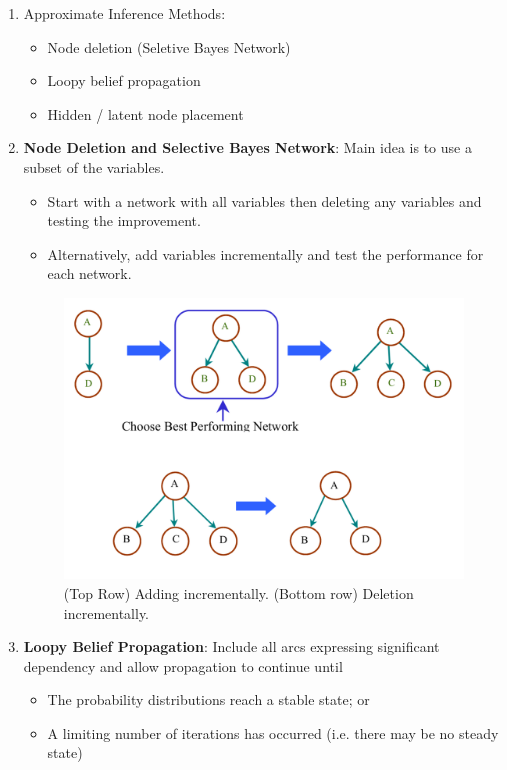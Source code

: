 \documentclass[12pt,twoside]{article}
\begin{document}
\begin{enumerate}
	\item Approximate Inference Methods:
		\begin{itemize}
			\item Node deletion (Seletive Bayes Network)
			\item Loopy belief propagation
			\item Hidden / latent node placement
		\end{itemize}
		
	\item \textbf{Node Deletion and Selective Bayes Network}: Main idea is to use a subset of the variables.
		\begin{itemize}
			\item Start with a network with all variables then deleting any variables and testing the improvement.
			\item Alternatively, add variables incrementally and test the performance for each network.
		\end{itemize}
		
\begin{figure}[H]		
	\begin{center}
		\includegraphics[width = 0.6\hsize]{./figures/SelectiveBayesianFinal.png} %
			\caption{(Top Row) Adding incrementally.  (Bottom row) Deletion incrementally.}
		\label{fig:NaiveBayes} %
\end{center}
\end{figure}			
		
		
	\item \textbf{Loopy Belief Propagation}: Include all arcs expressing significant dependency and allow propagation to continue until
		\begin{itemize}
			\item The probability distributions reach a stable state; or
			\item A limiting number of iterations has occurred (i.e. there may be no steady state)
		\end{itemize}


\end{enumerate}
\end{document}
